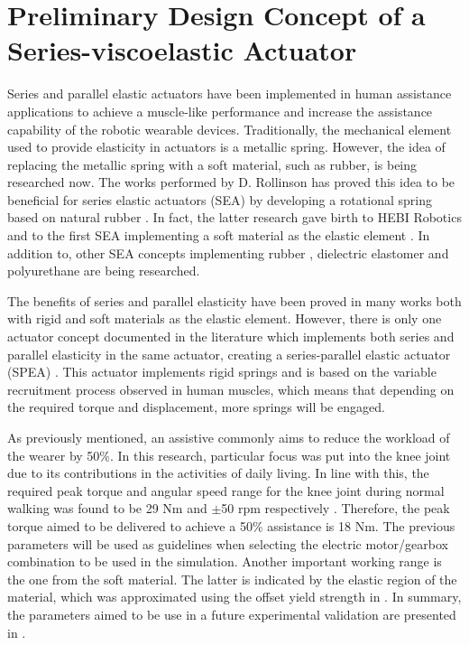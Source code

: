 \section{Preliminary Design Concept of a Series-viscoelastic Actuator}

Series and parallel elastic actuators have been implemented in human assistance applications to achieve a muscle-like performance and increase the assistance capability of the robotic wearable devices. Traditionally, the mechanical element used to provide elasticity in actuators is a metallic spring. However, the idea of replacing the metallic spring with a soft material, such as rubber, is being researched now. The works performed by D. Rollinson has proved this idea to be beneficial for series elastic actuators (SEA) by developing a rotational spring based on natural rubber \cite{rollinson2013design,rollinson2014design}. In fact, the latter research gave birth to HEBI Robotics and to the first SEA implementing a soft material as the elastic element \cite{HEBI2019}. In addition to, other SEA concepts implementing rubber \cite{austin2015control}, dielectric elastomer \cite{bolivar2016towards} and polyurethane \cite{martins2015polyurethane} are being researched.

The benefits of series and parallel elasticity have been proved in many works both with rigid and soft materials as the elastic element. However, there is only one actuator concept documented in the literature which implements both series and parallel elasticity in the same actuator, creating a series-parallel elastic actuator (SPEA) \cite{mathijssen2014variable}. This actuator implements rigid springs and is based on the variable recruitment process observed in human muscles, which means that depending on the required torque and displacement, more springs will be engaged.

As previously mentioned, an assistive commonly aims to reduce the workload of the wearer by 50\%. In this research, particular focus was put into the knee joint due to its contributions in the activities of daily living. In line with this, the required peak torque and angular speed range for the knee joint during normal walking was found to be 29 Nm and $\pm$50 rpm respectively \cite{dos2014impedance,winter2009biomechanics}. Therefore, the peak torque aimed to be delivered to achieve a 50\% assistance is 18 Nm. The previous parameters will be used as guidelines when selecting the electric motor/gearbox combination to be used in the simulation. Another important working range is the one from the soft material. The latter is indicated by the elastic region of the material, which was approximated using the offset yield strength in . In summary, the parameters aimed to be use in a future experimental validation are presented in .

